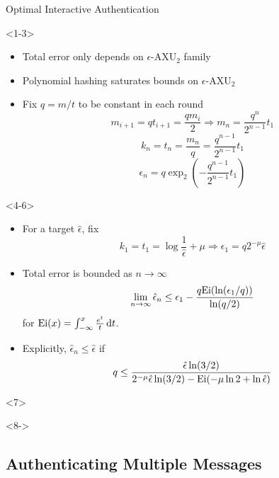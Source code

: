 \documentclass[xcolor=dvipsnames]{beamer}
\newcommand{\?}{\mathrel{?}} %
\newcommand{\dif}{\mathop{}\!\mathrm{d}} %
\newcommand{\AXU}{\mathrm{AXU}_{2}}
\newcommand{\eAXU}{\epsilon\text{-}\AXU}
\begin{document}
\begin{frame}{Optimal Interactive Authentication}
  \begin{onlyenv}<1-3>
    \begin{itemize}[<+->]
      \item Total error only depends on \(\eAXU\) family
      \item Polynomial hashing saturates bounds on \(\eAXU\)
      \item Fix \(q = m/t\) to be constant in each round
        \[ m_{i+1} = qt_{i+1} = \frac{qm_i}{2} \Rightarrow m_n = \frac{q^n}{2^{n-1}} t_1 \]
        \[ k_n = t_n = \frac{m_n}{q} = \frac{q^{n-1}}{2^{n-1}} t_1 \]
        \[ \epsilon_n = q \exp_2 \left( -\frac{q^{n-1}}{2^{n-1}} t_1 \right) \]
    \end{itemize}
  \end{onlyenv}
  \begin{onlyenv}<4-6>
    \begin{itemize}[<+->]
      \item For a target \(\hat{\epsilon}\), fix
        \[ k_1 = t_1 = \log \frac{1}{\hat{\epsilon}} + \mu \Rightarrow \epsilon_1 = q 2^{-\mu} \hat{\epsilon} \]
      \item Total error is bounded as \(n \to \infty\)
        \[ \lim_{n \to \infty} \hat{\epsilon}_n \leq  \epsilon_1 - \frac{q{\rm Ei}(\ln (\epsilon_1/q) )}{\ln (q/2)} \]
        for \(\Ei(x) = \int_{-\infty}^{x} \frac{e^{t}}{t} \dif{t}\).
      \item Explicitly, \(\hat{\epsilon}_n \leq \hat{\epsilon}\) if
        \[ q \leq \frac{\hat{\epsilon} \ln (3/2)}{2^{-\mu} \hat{\epsilon} \ln (3/2) - {\rm Ei}(-\mu \ln 2 + \ln \hat{\epsilon})} \]
    \end{itemize}
  \end{onlyenv}

  \begin{onlyenv}<7>
    \begin{figure}
    \end{figure}
  \end{onlyenv}

  \begin{onlyenv}<8->
    \begin{figure}
    \end{figure}
  \end{onlyenv}
\end{frame}

\subsection{Authenticating Multiple Messages}
\end{document}
